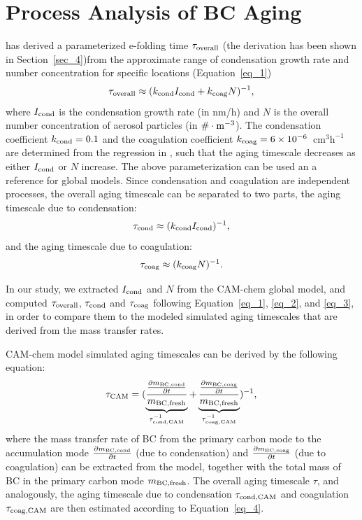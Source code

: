 \documentclass[12pt, fullpage]{uiucthesis2009}
\begin{document}
	\section{Process Analysis of BC Aging}
	\citet{Fierce2016} has derived a parameterized e-folding time $\tau_{\rm overall}$ (the derivation has been shown in Section~\ref{sec_4})from the approximate range of condensation growth rate and number concentration for specific locations (Equation~\ref{eq_1}) 
	\begin{align}{\label{eq_1}}
	\tau_{\rm overall} \approx (k_{\rm cond}I_{\rm cond} + k_{\rm coag}N)^{-1},
	\end{align} 
	where $I_{\rm cond}$ is the condensation growth rate (in nm/h) and $N$ is the overall number concentration of aerosol particles (in $ \# \cdot \rm m^{-3}$). The condensation coefficient $k_{\rm cond} = 0.1$ and the coagulation coefficient $k_{\rm coag} = 6\times 10^{-6}$~$\text{cm}^3\text{h}^{-1}$ are determined from the regression in \citet{Fierce2016}, such that the aging timescale decreases as either $I_{\rm cond}$ or $N$ increase. The above parameterization can be used an a reference for global models. Since condensation and coagulation are independent processes, the overall aging timescale can be separated to two parts, the aging timescale due to condensation:
	\begin{align}{\label{eq_2}}
	\tau_{\rm cond} \approx (k_{\rm cond}I_{\rm cond})^{-1},
	\end{align} 
	and the aging timescale due to coagulation:
	\begin{align}{\label{eq_3}}
	\tau_{\rm coag} \approx (k_{\rm coag}N)^{-1}.
	\end{align}  
	
    In our study, we extracted $I_{\rm cond}$ and $N$ from the CAM-chem global model, and computed $\tau_{\rm overall}$, $\tau_{\rm cond}$ and $\tau_{\rm coag}$ following Equation~\ref{eq_1}, \ref{eq_2}, and \ref{eq_3}, in order to compare them to the modeled simulated aging timescales that are derived from the mass transfer rates.
	
	CAM-chem model simulated aging timescales can be derived by the following equation:
	\begin{align}{\label{eq_4}}
	\tau_{\rm CAM} = (\underbrace{\frac{\frac{\partial m_{\rm BC, cond}}{\partial t}}{m_{\rm BC, fresh}}}_{\tau_{\rm cond, CAM}^{-1}} + \underbrace{\frac{\frac{\partial m_{\rm BC, coag}}{\partial t}}{m_{\rm BC, fresh}}}_{\tau_{\rm coag, CAM}^{-1}})^{-1},
	\end{align} 
	where the mass transfer rate of BC from the primary carbon mode to the accumulation mode $\frac{\partial m_{\rm BC, cond}}{\partial t}$ (due to condensation) and $\frac{\partial m_{\rm BC, coag}}{\partial t}$ (due to coagulation) can be extracted from the model, together with the total mass of BC in the primary carbon mode $m_{\rm BC, fresh}$. The overall aging timescale $\tau$, and analogously, the aging timescale due to condensation $\tau_{\rm cond, CAM}$ and coagulation $\tau_{\rm coag, CAM}$ are then estimated according to Equation~\ref{eq_4}.
	
\end{document}
